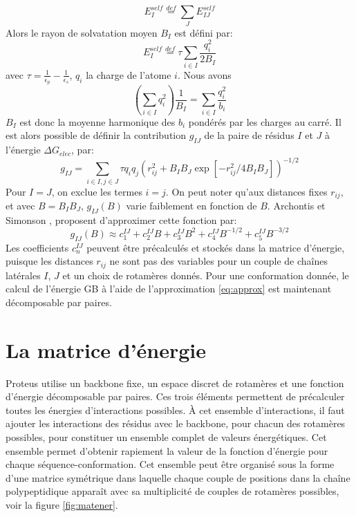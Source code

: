 \begin{equation}
  E_I^{self} \stackrel{def}{=} \sum_J E_{IJ}^{self}
\end{equation}
Alors le rayon de solvatation moyen $B_I$ est défini par:
\begin{equation}
  E^{self}_I \stackrel{def}{=} \tau \sum_{i \in I} \frac{q_i^2}{2 B_I}
\end{equation} 
avec $ \tau = \frac{1}{\epsilon_p} - \frac{1}{\epsilon_s}$, $q_i$ la charge de l'atome $i$. Nous avons
\begin{equation}
\left( \sum_{i \in I} q_i^2 \right) \frac{1}{B_I} = \sum_{i \in I} \frac{q_i^2}{b_i}
\end{equation}
$B_I$ est donc la moyenne harmonique des $b_i$ pondérés par les charges au carré. Il est alors possible de définir la contribution $g_{IJ}$ de la paire de résidus $I$ et $J$ à l'énergie $\Delta G_{elec}$, par:
\begin{equation} 
g_{IJ} = \sum_{i \in I, j \in J} \tau q_i q_j \left( r_{ij}^2 + B_I B_J \exp[-r_{ij}^2/4 B_I B_J] \right)^{-1/2}
\label{eq:screen}
\end{equation}
Pour $I=J$, on exclue les termes $i=j$. On peut noter qu'aux distances fixes $r_{ij}$, et avec $B=B_IB_J$, $g_{IJ} (B)$ varie faiblement en fonction de $B$. Archontis et Simonson \cite{Archontis05}, proposent d'approximer cette fonction par:
\begin{equation}
  \label{eq:approx}
g_{IJ}(B) \approx c_1^{IJ} + c_2^{IJ} B + c_3^{IJ} B^2 + c_4^{IJ} B^{-1/2} + c_5^{IJ} B^{-3/2} 
\end{equation}
Les coefficients $c_n^{IJ}$ peuvent être précalculés et stockés dans la matrice d'énergie, puisque les distances $r_{ij}$ ne sont pas des variables pour un couple de chaînes latérales $I$, $J$ et un choix de rotamères donnés. Pour une conformation donnée, le calcul de l'énergie GB à l'aide de l'approximation \ref{eq:approx} est maintenant décomposable par paires.

\section{La matrice d'énergie}

Proteus utilise un backbone fixe, un espace discret de rotamères et une fonction d'énergie décomposable par paires. Ces trois éléments permettent de précalculer toutes les énergies d'interactions possibles. À cet ensemble d'interactions, il faut ajouter les interactions des résidus avec le backbone, pour chacun des rotamères possibles, pour constituer un ensemble complet de valeurs énergétiques. Cet ensemble  permet d'obtenir rapiement la valeur de la fonction d'énergie pour chaque séquence-conformation. Cet ensemble peut être organisé sous la forme d'une matrice symétrique dans laquelle chaque couple de positions dans la chaîne polypeptidique apparaît avec sa multiplicité de couples de rotamères possibles, voir la figure \ref{fig:matener}.      

